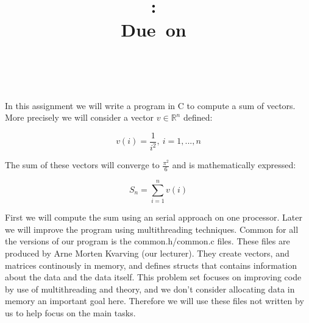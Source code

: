 \documentclass{article}
\title{
\vspace{2in}
\textmd{\textbf{\hmwkClass:\ \hmwkTitle}}\\
\normalsize\vspace{0.1in}\small{Due\ on\ \hmwkDueDate}\\
\vspace{0.1in}\large{\textit{\hmwkClassInstructor\ \hmwkClassTime}}
\vspace{3in}
}
\author{\textbf{\hmwkAuthorName}}
\date{} %
\begin{document}
\maketitle



 \newpage



\section{}
	
	In this assignment we will write a program in C to compute a sum of vectors. More precisely we will consider a vector $ v \in \mathbb{R}^n $ defined:

	$$ v(i) = \frac{1}{i^2}, \ i=1,...,n$$

	The sum of these vectors will converge to $ \frac{\pi^2}{6} $ and is mathematically expressed:

	$$ S_n = \sum\limits_{i=1}^n v(i) $$ 

	First we will compute the sum using an serial approach on one processor. Later we will improve the program using multithreading techniques. Common for all the versions of our program is the common.h/common.c files. These files are produced by Arne Morten Kvarving (our lecturer). They create vectors, and matrices continously in memory, and defines structs that contains information about the data and the data itself. This problem set focuses on improving code by use of multithreading and theory, and we don't consider allocating data in memory an important goal here. Therefore we will use these files not written by us to help focus on the main tasks.
\end{document}
